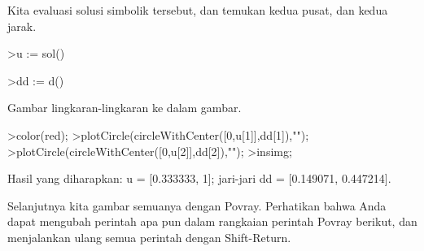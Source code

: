 \documentclass[a4paper,10pt]{article}
\begin{document}
\begin{eulernotebook}
\begin{eulercomment}
\begin{eulercomment}
\begin{eulercomment}
\begin{eulercomment}
\begin{eulercomment}
\begin{eulercomment}
\begin{eulercomment}
\begin{eulercomment}
\begin{eulercomment}
\begin{eulercomment}
\begin{eulercomment}
\begin{eulercomment}
\begin{eulercomment}
\begin{eulercomment}
\begin{eulercomment}
\begin{eulercomment}
\begin{eulercomment}
Kita evaluasi solusi simbolik tersebut, dan temukan kedua pusat, dan kedua jarak.
\end{eulercomment}
\begin{eulerprompt}
>u := sol()
\end{eulerprompt}
\begin{euleroutput}
  [0.333333,  1]
\end{euleroutput}
\begin{eulerprompt}
>dd := d()
\end{eulerprompt}
\begin{euleroutput}
  [0.149071,  0.447214]
\end{euleroutput}
\begin{eulercomment}
Gambar lingkaran-lingkaran ke dalam gambar.
\end{eulercomment}
\begin{eulerprompt}
>color(red);
>plotCircle(circleWithCenter([0,u[1]],dd[1]),"");
>plotCircle(circleWithCenter([0,u[2]],dd[2]),"");
>insimg;
\end{eulerprompt}
\begin{eulercomment}
Hasil yang diharapkan: u = [0.333333, 1]; jari-jari dd = [0.149071, 0.447214].

\end{eulercomment}
\begin{eulercomment}
Selanjutnya kita gambar semuanya dengan Povray. Perhatikan bahwa Anda dapat mengubah perintah
apa pun dalam rangkaian perintah Povray berikut, dan menjalankan ulang semua perintah dengan
Shift-Return.


\end{eulercomment}
\end{eulercomment}
\end{eulercomment}
\end{eulercomment}
\end{eulercomment}
\end{eulercomment}
\end{eulercomment}
\end{eulercomment}
\end{eulercomment}
\end{eulercomment}
\end{eulercomment}
\end{eulercomment}
\end{eulercomment}
\end{eulercomment}
\end{eulercomment}
\end{eulercomment}
\end{eulercomment}
\end{eulernotebook}
\end{document}
